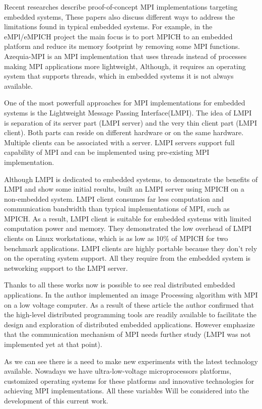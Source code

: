 Recent researches \cite{Saldana} \cite{Gallego} \cite{McMahon} describe
proof-of-concept MPI implementations targeting embedded systems,  These papers
also discuss different ways to address the limitations found in typical
embedded systems. For example, in the eMPl/eMPICH project \cite{McMahon} the
main focus is to port MPICH to an embedded platform and reduce its memory
footprint by removing some MPI functions. Azequia-MPI \cite{Gallego} is an MPI
implementation that uses threads instead of processes making MPI applications
more lightweight, Although, it requires an operating system that supports
threads, which in embedded systems it is not always available. 

One of the most powerfull approaches for MPI implementations for embedded
systems is the Lightweight Message Passing Interface(LMPI)\cite{Abgaria}. The
idea of LMPI is separation of its server part (LMPI server) and the very thin
client part (LMPI client). Both parts can reside on different hardware or on
the same hardware. Multiple clients can be associated with a server. LMPI
servers support full capability of MPI and can be implemented using
pre-existing MPI implementation. 

Although LMPI is dedicated to embedded systems, to demonstrate the benefits of
LMPI and show some initial results, \cite{Abgaria} built an LMPI server using
MPICH on a non-embedded system. LMPI client consumes far less computation and
communication bandwidth than typical implementations of MPI, such as MPICH.  As
a result, LMPI client is suitable for embedded systems with limited computation
power and memory. They demonstrated the low overhead of LMPI clients on Linux
workstations, which is as low as 10\% of MPICH for two benchmark applications.
LMPI clients are highly portable because they don't rely on the operating
system support. All they require from the embedded system is networking support
to the LMPI server.

Thanks to all these works now is possible to see real distributed embedded
applications. In \cite{Liu} the author implemented an image Processing algorithm
with MPI on a low voltage computer. As a result of these article the author
confirmed that the high-level distributed programming tools are readily
available to facilitate the design and exploration of distributed embedded
applications. However emphasize that the communication mechanism of MPI needs
further study (LMPI was not implemented yet at that point). 

As we can see there is a need to make new experiments with the latest
technology available. Nowadays we have ultra-low-voltage microprocessors
platforms, customized operating systems for these platforms and  innovative
technologies for achieving MPI implementations. All these variables Will be
considered into the development of this current work.

\newpage

\clearpage
